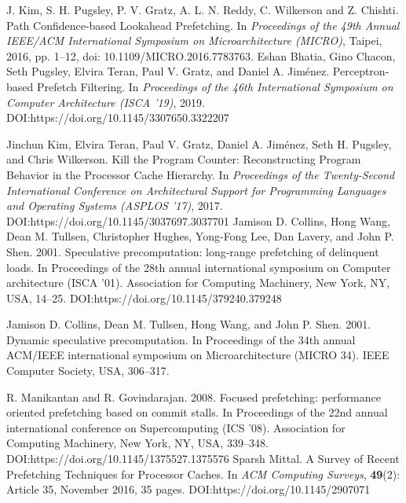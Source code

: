 \begin{thebibliography}{5}
J. Kim, S. H. Pugsley, P. V. Gratz, A. L. N. Reddy, C. Wilkerson and Z. Chishti. Path Confidence-based Lookahead Prefetching. In {\it Proceedings of the 49th Annual IEEE/ACM International Symposium on Microarchitecture (MICRO)\/}, Taipei, 2016, pp. 1--12, doi: 10.1109/MICRO.2016.7783763.
Eshan Bhatia, Gino Chacon, Seth Pugsley, Elvira Teran, Paul V. Gratz, and Daniel A. Jiménez. Perceptron-based Prefetch Filtering. In {\it Proceedings of the 46th International Symposium on Computer Architecture (ISCA ’19)\/}, 2019. DOI:https://doi.org/10.1145/3307650.3322207


Jinchun Kim, Elvira Teran, Paul V. Gratz, Daniel A. Jiménez, Seth H. Pugsley, and Chris Wilkerson. Kill the Program Counter: Reconstructing Program Behavior in the Processor Cache Hierarchy. In {\it Proceedings of the Twenty-Second International Conference on Architectural Support for Programming Languages and Operating Systems (ASPLOS ’17)\/}, 2017. DOI:https://doi.org/10.1145/3037697.3037701
Jamison D. Collins, Hong Wang, Dean M. Tullsen, Christopher Hughes, Yong-Fong Lee, Dan Lavery, and John P. Shen. 2001. Speculative precomputation: long-range prefetching of delinquent loads. In Proceedings of the 28th annual international symposium on Computer architecture (ISCA ’01). Association for Computing Machinery, New York, NY, USA, 14–25. DOI:https://doi.org/10.1145/379240.379248


Jamison D. Collins, Dean M. Tullsen, Hong Wang, and John P. Shen. 2001. Dynamic speculative precomputation. In Proceedings of the 34th annual ACM/IEEE international symposium on Microarchitecture (MICRO 34). IEEE Computer Society, USA, 306–317.


R. Manikantan and R. Govindarajan. 2008. Focused prefetching: performance oriented prefetching based on commit stalls. In Proceedings of the 22nd annual international conference on Supercomputing (ICS ’08). Association for Computing Machinery, New York, NY, USA, 339–348. DOI:https://doi.org/10.1145/1375527.1375576
Sparsh Mittal. A Survey of Recent Prefetching Techniques for Processor Caches. In {\it ACM Computing Surveys\/}, {\bf 49}(2): Article 35, November 2016, 35 pages. DOI:https://doi.org/10.1145/2907071


\end{thebibliography}
